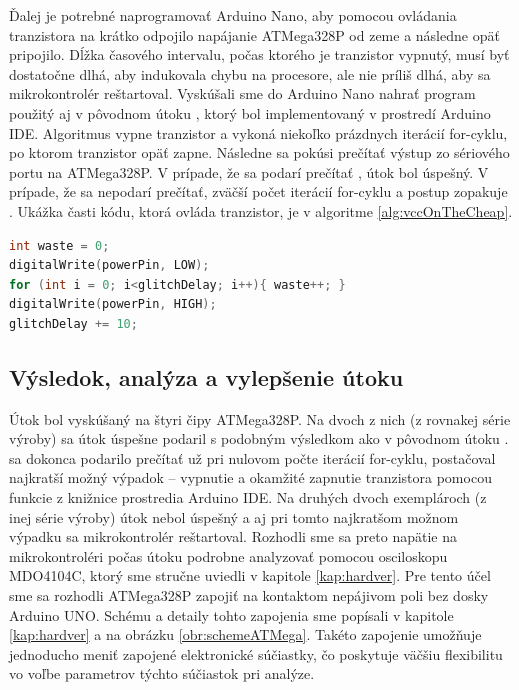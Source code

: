 Ďalej je potrebné naprogramovať Arduino Nano, aby pomocou ovládania tranzistora na krátko odpojilo napájanie ATMega328P od zeme a následne opäť pripojilo. Dĺžka časového intervalu, počas ktorého je tranzistor vypnutý, musí byť dostatočne dlhá, aby indukovala chybu na procesore, ale nie príliš dlhá, aby sa mikrokontrolér reštartoval. Vyskúšali sme do Arduino Nano nahrať program použitý aj v pôvodnom útoku \cite{vccOnTheCheap}, ktorý bol implementovaný v prostredí Arduino IDE. Algoritmus vypne tranzistor a vykoná niekoľko prázdnych iterácií for-cyklu, po ktorom tranzistor opäť zapne. Následne sa pokúsi prečítať výstup zo sériového portu na ATMega328P. V prípade, že sa podarí prečítať , útok bol úspešný. V prípade, že sa  nepodarí prečítať, zväčší počet iterácií for-cyklu a postup zopakuje \cite{vccOnTheCheap}. Ukážka časti kódu, ktorá ovláda tranzistor, je v algoritme \ref{alg:vccOnTheCheap}.

\begin{lstlisting}[float,language=C,caption={Ovládanie tranzistora, ktorý spína napájanie na ATMega328P. Prevzaté zo zdrojového kódu pôvodného útoku \cite{vccOnTheCheap}.},label=alg:vccOnTheCheap]
int waste = 0;
digitalWrite(powerPin, LOW);
for (int i = 0; i<glitchDelay; i++){ waste++; }                    
digitalWrite(powerPin, HIGH);
glitchDelay += 10;
\end{lstlisting}

\subsection{Výsledok, analýza a vylepšenie útoku}
Útok bol vyskúšaný na štyri čipy ATMega328P. Na dvoch z nich (z rovnakej série výroby) sa útok úspešne podaril s podobným výsledkom ako v pôvodnom útoku \cite{vccOnTheCheap}.  sa dokonca podarilo prečítať už pri nulovom počte iterácií for-cyklu, postačoval najkratší možný výpadok -- vypnutie a okamžité zapnutie tranzistora pomocou funkcie  z knižnice prostredia Arduino IDE. Na druhých dvoch exemplároch (z inej série výroby) útok nebol úspešný a aj pri tomto najkratšom možnom výpadku sa mikrokontrolér reštartoval. Rozhodli sme sa preto napätie na mikrokontroléri počas útoku podrobne analyzovať pomocou osciloskopu MDO4104C, ktorý sme stručne uviedli v kapitole \ref{kap:hardver}. Pre tento účel sme sa rozhodli ATMega328P zapojiť na kontaktom nepájivom poli bez dosky Arduino UNO. Schému a detaily tohto zapojenia sme popísali v kapitole \ref{kap:hardver} a na obrázku \ref{obr:schemeATMega}. Takéto zapojenie umožňuje jednoducho meniť zapojené elektronické súčiastky, čo poskytuje väčšiu flexibilitu vo voľbe parametrov týchto súčiastok pri analýze.

